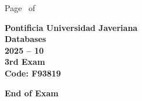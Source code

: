 \documentclass[11pt, addpoints, answers]{exam}\usepackage[utf8]{inputenc}
\begin{document}
\begin{coverpages}
\begin{center}
			\vspace{3mm}
			\leavevmode \hspace{5mm} 
		\end{center}
	\end{coverpages}

	\footer{} {Page \thepage\ of \numpages} {}

	\centering
	\textbf{\Large Pontificia Universidad Javeriana}\\
	\textbf{\Large Databases} \\
	\textbf{\large 2025 -- 10} \\
	\textbf{\large 3rd Exam} \\
	\textbf{Code: F93819}


	\begin{questions}
		
		
		
		
		
		
		
		
		
		
		
		
		
		
		
		
		
		
		
		
	\end{questions}

	\vspace{5mm}
	\noindent \textbf{End of Exam}
\end{document}
